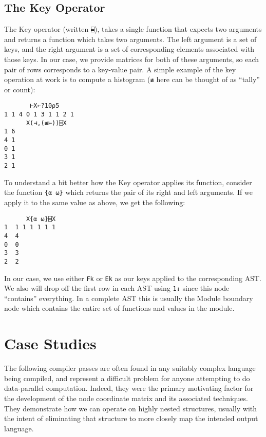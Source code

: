 \documentclass[numbers,preprint]{sigplanconf}
\begin{document}
\subsection{The Key Operator}

The Key operator (written \verb;⌸;), takes a single function
that expects two arguments and returns a function which takes two
arguments. The left argument is a set of keys, and the right argument
is a set of corresponding elements associated with those keys. In our
case, we provide matrices for both of these arguments, so each pair
of rows corresponds to a key-value pair. A simple example of the key
operation at work is to compute a histogram (\verb;≢; here can be thought
of as ``tally'' or count):

\begin{verbatim}
       ⊢X←?10⍴5
1 1 4 0 1 3 1 1 2 1
      X(⊣,(≢⊢))⌸X
1 6
4 1
0 1
3 1
2 1
\end{verbatim}

To understand a bit better how the Key operator applies its function,
consider the function \verb;{⍺ ⍵}; which returns the pair of its right
and left arguments. If we apply it to the same value as above, we
get the following:

\begin{verbatim}
      X{⍺ ⍵}⌸X
1  1 1 1 1 1 1 
4  4           
0  0           
3  3           
2  2
\end{verbatim}

In our case, we use either \verb;Fk; or \verb;Ek; as our keys applied to the
corresponding AST. We also will drop off the first row in each AST
using \verb;1↓; since this node ``contains'' everything. In a complete
AST this is usually the Module boundary node which contains the entire
set of functions and values in the module.

\section{Case Studies}

The following compiler passes are often found in any suitably complex 
language being compiled, and represent a difficult problem for anyone attempting 
to do data-parallel computation. Indeed, they were the primary motivating 
factor for the development of the node coordinate matrix and its associated 
techniques. They demonstrate how we can operate on highly nested structures, 
usually with the intent of eliminating that structure to more closely map 
the intended output language. 
\end{document}
